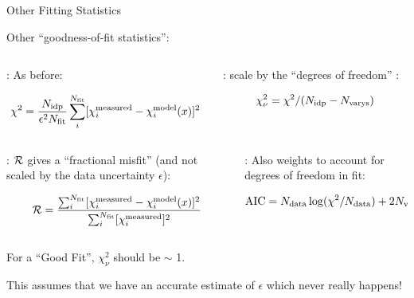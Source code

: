 \begin{slide}{Other Fitting Statistics}

  \begin{cenpage}{135mm}
  Other ``goodness-of-fit statistics'':

\vmm\vmm


  \begin{columns}[T]
    \begin{column}{65mm}
      {}: As before:

    \begin{postitbox}{56mm}
      \[
      \chi^2  =  \frac{ N_{\rm idp}}{\epsilon^2 N_{\rm fit}}
      \sum_i^{N_{\rm fit}} [\chi_i^{\rm measured} - \chi_i^{\rm model}({x})]^2
      \]
    \end{postitbox}
    \end{column}
    \begin{column}{65mm}
      {}: scale by the ``degrees of freedom'' :

      \begin{postitbox}{56mm}
        \[ \chi^2_\nu =  \chi^2 / (N_{\rm idp}-N_{\rm varys})      \]
        \end{postitbox}
    \end{column}
  \end{columns}

  \vmm  \vmm  \pause

  \begin{columns}[T]
    \begin{column}{65mm}

      {}: $\cal{R}$  gives a ``fractional misfit'' (and
      not scaled by the data  uncertainty $\epsilon$):

      \begin{postitbox}{56mm}
        \[
      {\cal{R}} = \frac{\sum_i^{N_{\rm fit}}[\chi_i^{\rm measured} -
        \chi_i^{\rm model}({x})]^2 }{
        \sum_i^{N_{\rm fit}} [{\chi_i^{\rm measured}}]^2}
    \]
  \end{postitbox}

    \end{column}
    \begin{column}{65mm}

      {}: Also weights to account for
      degrees of freedom in fit:

      \begin{postitbox}{56mm}
        \[
          {\rm{AIC}} =N_{\rm data}  \log(\chi^2/N_{\rm data}) + 2 N_{\rm varys}
        \]
      \end{postitbox}

    \end{column}
  \end{columns}


  \vmm
  For a ``Good Fit'', $\chi^2_\nu$ should be $\sim$ 1.

  This assumes that  we have an accurate estimate of $\epsilon$ which never really happens!

\vmm


\vfill
\end{cenpage}
\end{slide}

